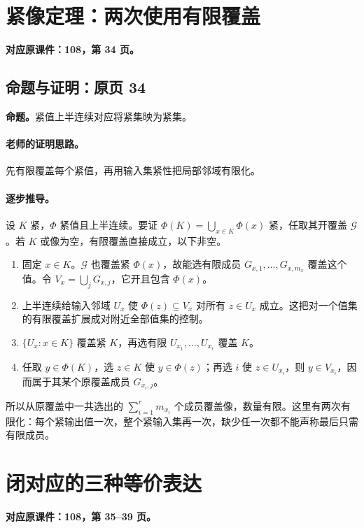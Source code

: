 \documentclass[11pt,a4paper]{article}
\theoremstyle{definition}\newtheorem{definition}{定义}\newtheorem{example}{例}
\begin{document}
\clearpage\section{紧像定理：两次使用有限覆盖}\label{g:108:34}

\textbf{对应原课件：108，第 34 页。}



\subsection{命题与证明：原页 34}

\textbf{命题。}紧值上半连续对应将紧集映为紧集。

\paragraph{老师的证明思路。}先有限覆盖每个紧值，再用输入集紧性把局部邻域有限化。

\paragraph{逐步推导。}
设 $K$ 紧，$\Phi$ 紧值且上半连续。要证 $\Phi(K)=\bigcup_{x\in K}\Phi(x)$ 紧，任取其开覆盖 $\mathcal G$。若 $K$ 或像为空，有限覆盖直接成立，以下非空。
\begin{enumerate}
\item 固定 $x\in K$。$\mathcal G$ 也覆盖紧 $\Phi(x)$，故能选有限成员 $G_{x,1},\ldots,G_{x,m_x}$ 覆盖这个值。令 $V_x=\bigcup_jG_{x,j}$，它开且包含 $\Phi(x)$。
\item 上半连续给输入邻域 $U_x$ 使 $\Phi(z)\subseteq V_x$ 对所有 $z\in U_x$ 成立。这把对一个值集的有限覆盖扩展成对附近全部值集的控制。
\item $\{U_x:x\in K\}$ 覆盖紧 $K$，再选有限 $U_{x_1},\ldots,U_{x_r}$ 覆盖 $K$。
\item 任取 $y\in\Phi(K)$，选 $z\in K$ 使 $y\in\Phi(z)$；再选 $i$ 使 $z\in U_{x_i}$，则 $y\in V_{x_i}$，因而属于其某个原覆盖成员 $G_{x_i,j}$。
\end{enumerate}
所以从原覆盖中一共选出的 $\sum_{i=1}^r m_{x_i}$ 个成员覆盖像，数量有限。这里有两次有限化：每个紧输出值一次，整个紧输入集再一次，缺少任一次都不能声称最后只需有限成员。


\clearpage\section{闭对应的三种等价表达}\label{g:108:35}

\textbf{对应原课件：108，第 35--39 页。}
\end{document}
